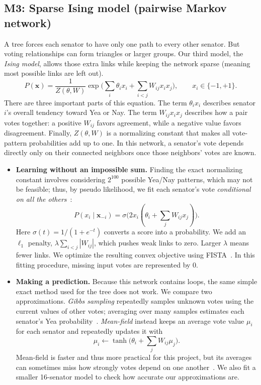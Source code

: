 \documentclass[10pt]{article}
\begin{document}
\subsection{M3: Sparse Ising model (pairwise Markov network)}
A tree forces each senator to have only one path to every other senator. But voting relationships can form triangles or larger groups. Our third model, the \emph{Ising model}, allows those extra links while keeping the network sparse (meaning most possible links are left out).
\begin{equation}
P(\mathbf x)=\frac{1}{Z(\theta,W)}\exp\Big(\sum_i\theta_ix_i+\sum_{i<j}W_{ij}x_ix_j\Big),\qquad x_i\in\{-1,+1\}.
\end{equation}
There are three important parts of this equation. The term $\theta_ix_i$ describes senator $i$'s overall tendency toward Yea or Nay. The term $W_{ij}x_ix_j$ describes how a pair votes together: a positive $W_{ij}$ favors agreement, while a negative value favors disagreement. Finally, $Z(\theta,W)$ is a normalizing constant that makes all vote-pattern probabilities add up to one. In this network, a senator's vote depends directly only on their connected neighbors once those neighbors' votes are known.
\begin{itemize}
\item \textbf{Learning without an impossible sum.} Finding the exact normalizing constant involves considering $2^{100}$ possible Yea/Nay patterns, which may not be feasible; thus, by pseudo likelihood, we fit each senator's vote \emph{conditional on all the others}~\cite{besag1975,ravikumar2010}:
\begin{equation}
P(x_i\mid\mathbf x_{-i})=\sigma\Big(2x_i(\theta_i+\sum_jW_{ij}x_j)\Big).
\end{equation}
Here $\sigma(t)=1/(1+e^{-t})$ converts a score into a probability. We add an $\ell_1$ penalty, $\lambda\sum_{i<j}|W_{ij}|$, which pushes weak links to zero. Larger $\lambda$ means fewer links. We optimize the resulting convex objective using FISTA~\cite{beck2009}. In this fitting procedure, missing input votes are represented by 0.
\item \textbf{Making a prediction.} Because this network contains loops, the same simple exact method used for the tree does not work. We compare two approximations. \emph{Gibbs sampling} repeatedly samples unknown votes using the current values of other votes; averaging over many samples estimates each senator's Yea probability~\cite{geman1984}. \emph{Mean-field} instead keeps an average vote value $\mu_i$ for each senator and repeatedly updates it with
\begin{equation}
\mu_i\leftarrow\tanh\Big(\theta_i+\sum_jW_{ij}\mu_j\Big).
\end{equation}
Mean-field is faster and thus more practical for this project, but its averages can sometimes miss how strongly votes depend on one another~\cite{wainwright2008}. We also fit a smaller 16-senator model to check how accurate our approximations are.
\end{itemize}
\end{document}
